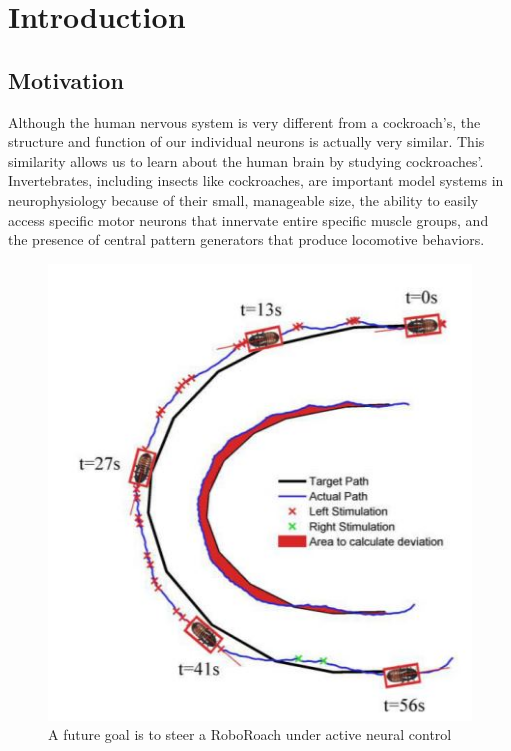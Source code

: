 \section{Introduction}

\subsection{Motivation}
Although the human nervous system is very different from a cockroach’s, the structure and function of our individual neurons is actually very similar. This similarity allows us to learn about the human brain by studying cockroaches'. Invertebrates, including insects like cockroaches, are important model systems in neurophysiology because of their small, manageable size, the ability to easily access specific motor neurons that innervate entire specific muscle groups, and the presence of central pattern generators that produce locomotive behaviors. 

\begin{figure}[ht!]
\centering
\includegraphics[scale=0.5]{Figures/motivation1.JPG}
\caption{A future goal is to steer a RoboRoach under active neural control}
\label{fig:motivation1}
\end{figure}

